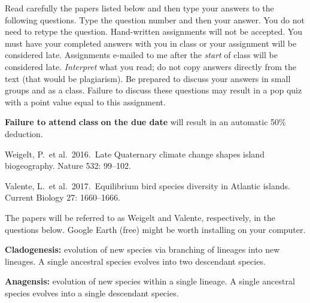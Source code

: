 \documentclass[11pt, addpoints]{exam}
\begin{document}
Read carefully the papers listed below and then type your answers to the following questions.
Type the question number and then your answer. You do not need to retype the question. Hand-written
assignments will not be accepted. You must have your completed answers
with you in class or your assignment will be considered late. Assignments e-mailed to me after the \emph{start} of class will be
considered late. \emph{Interpret} what you read; do not copy answers directly from the text (that would
be plagiarism). Be prepared to discuss your answers in small groups and as a class. Failure
to discuss these questions may result in a pop quiz with a point value
equal to this assignment.

\textbf{Failure to attend} \textbf{class} \textbf{on the due date} will
result in an automatic 50\% deduction.

\begin{hangparas}{1.5em}{1}
Weigelt, P.~et al.~2016.~Late Quaternary climate change shapes
island biogeography. Nature 532: 99–102.

Valente, L.~et al.~2017.~Equilibrium bird species diversity in
Atlantic islands. Current Biology 27: 1660–1666. 
\end{hangparas}

The papers will be referred to as Weigelt and Valente, respectively, in the questions below. Google Earth (free) might be worth installing on your computer.

\textbf{Cladogenesis:} evolution of new species via branching of lineages into new lineages. A single ancestral species evolves into two descendant species.

\textbf{Anagensis:} evolution of new species within a single lineage. A single ancestral species evolves into a single descendant species.
\end{document}
